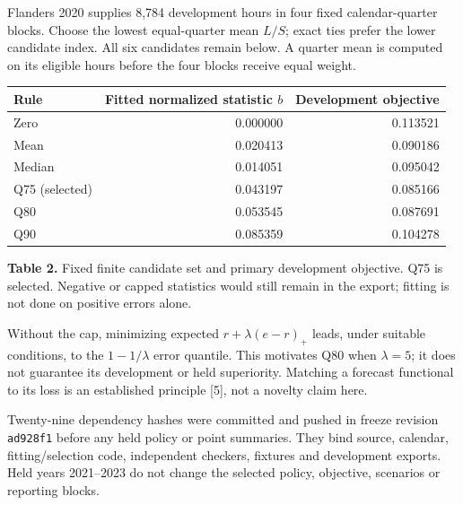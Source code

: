 \documentclass[10pt,letterpaper]{article}
\begin{document}
Flanders 2020 supplies 8,784 development hours in four fixed calendar-quarter blocks. Choose the lowest equal-quarter mean $L/S$; exact ties prefer the lower candidate index. All six candidates remain below. A quarter mean is computed on its eligible hours before the four blocks receive equal weight.

\begin{center}\begin{tabular}{lrr}\toprule
Rule & Fitted normalized statistic $b$ & Development objective\\\midrule
Zero & 0.000000 & 0.113521 \\
Mean & 0.020413 & 0.090186 \\
Median & 0.014051 & 0.095042 \\
Q75 (selected) & 0.043197 & 0.085166 \\
Q80 & 0.053545 & 0.087691 \\
Q90 & 0.085359 & 0.104278 \\
\bottomrule\end{tabular}\end{center}
\textbf{Table 2.} Fixed finite candidate set and primary development objective. Q75 is selected. Negative or capped statistics would still remain in the export; fitting is not done on positive errors alone.

Without the cap, minimizing expected $r+\lambda(e-r)_+$ leads, under suitable conditions, to the $1-1/\lambda$ error quantile. This motivates Q80 when $\lambda=5$; it does not guarantee its development or held superiority. Matching a forecast functional to its loss is an established principle [5], not a novelty claim here.

Twenty-nine dependency hashes were committed and pushed in freeze revision \texttt{ad928f1} before any held policy or point summaries. They bind source, calendar, fitting/selection code, independent checkers, fixtures and development exports. Held years 2021--2023 do not change the selected policy, objective, scenarios or reporting blocks.
\newpage
\end{document}
